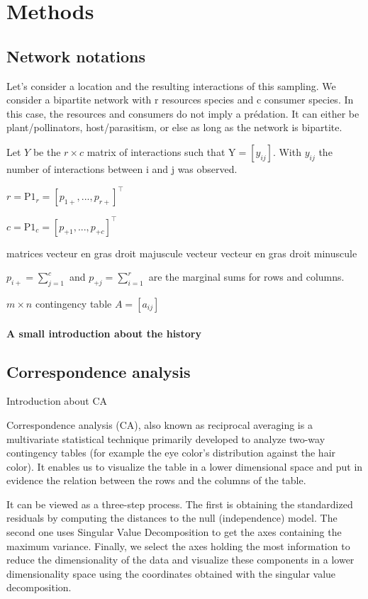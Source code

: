 \section{Methods}

\subsection{Network notations}
Let's consider a location and the resulting interactions of this sampling. We consider a bipartite network with r resources species and c consumer species. In this case, the resources and consumers do not imply a prédation. It can either be plant/pollinators, host/parasitism, or else as long as the network is bipartite. 

Let $Y$ be the $r\times c$ matrix of interactions such that $\textrm{Y} = [y_{ij}]$. With $y_{ij}$ the number of interactions between i and j was observed.

$r=\textrm{P1}_r =[p_{1+}, ..., p_{r+}]^\intercal$

$c=\textrm{P1}_c=[p_{+1}, ..., p_{+c}]^\intercal$

matrices vecteur en gras droit majuscule
vecteur vecteur en gras droit minuscule

$p_{i+}=\sum_{j=1}^{c}$ and $p_{+j}=\sum_{i=1}^{r}$ are the marginal sums for rows and columns.




$m\times n$ contingency table $A = [a_{ij}]$ 

\paragraph{A small introduction about the history}




\subsection{Correspondence analysis}

Introduction about CA

Correspondence analysis (CA), also known as reciprocal averaging is a multivariate statistical technique  primarily developed to analyze two-way contingency tables (for example the eye color's distribution against the hair color). It enables us to visualize the table in a lower dimensional space and put in evidence the relation between the rows and the columns of the table.

It can be viewed as a three-step process. The first is obtaining the standardized residuals by computing the distances to the null (independence) model. The second one uses Singular Value Decomposition to get the axes containing the maximum variance. Finally, we select the axes holding the most information to reduce the dimensionality of the data and visualize these components in a lower dimensionality space using the coordinates obtained with the singular value decomposition.


